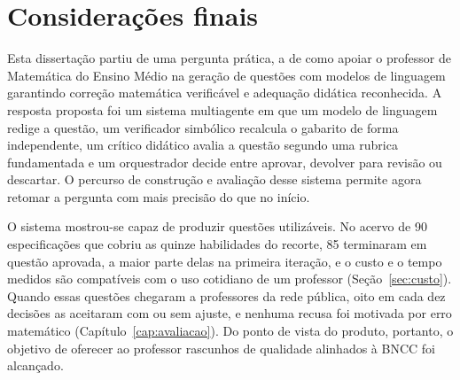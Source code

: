 \chapter*{Considerações finais}
\label{cap:conclusao}


Esta dissertação partiu de uma pergunta prática, a de como apoiar o professor de Matemática do
Ensino Médio na geração de questões com modelos de linguagem garantindo correção matemática
verificável e adequação didática reconhecida. A resposta proposta foi um sistema multiagente em que
um modelo de linguagem redige a questão, um verificador simbólico recalcula o gabarito de forma
independente, um crítico didático avalia a questão segundo uma rubrica fundamentada e um orquestrador
decide entre aprovar, devolver para revisão ou descartar. O percurso de construção e avaliação desse
sistema permite agora retomar a pergunta com mais precisão do que no início.

O sistema mostrou-se capaz de produzir questões utilizáveis. No acervo de 90 especificações que
cobriu as quinze habilidades do recorte, 85 terminaram em questão aprovada, a maior parte delas na
primeira iteração, e o custo e o tempo medidos são compatíveis com o uso cotidiano de um professor
(Seção~\ref{sec:custo}). Quando essas questões chegaram a professores da rede pública, oito em cada
dez decisões as aceitaram com ou sem ajuste, e nenhuma recusa foi motivada por erro matemático
(Capítulo~\ref{cap:avaliacao}). Do ponto de vista do produto, portanto, o objetivo de oferecer ao
professor rascunhos de qualidade alinhados à BNCC foi alcançado.

